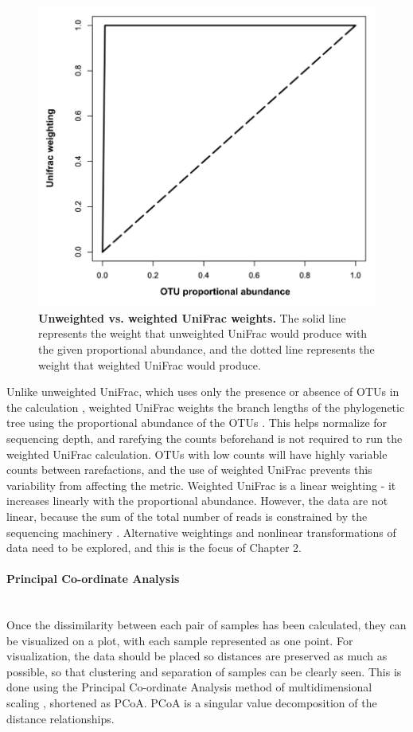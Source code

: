 \begin{figure}[h]
\includegraphics[scale=0.5]{weights.png}
\caption[Unweighted vs. weighted UniFrac weights.]{{\bf Unweighted vs. weighted UniFrac weights.}
The solid line represents the weight that unweighted UniFrac would produce with the given proportional abundance, and the dotted line represents the weight that weighted UniFrac would produce.}
\label{figure_weights}
\end{figure}

Unlike unweighted UniFrac, which uses only the presence or absence of OTUs in the calculation \cite{lozupone2005unifrac}, weighted UniFrac weights the branch lengths of the phylogenetic tree using the proportional abundance of the OTUs \cite{lozupone2007quantitative}. This helps normalize for sequencing depth, and rarefying the counts beforehand is not required to run the weighted UniFrac calculation. OTUs with low counts will have highly variable counts between rarefactions, and the use of weighted UniFrac prevents this variability from affecting the metric. Weighted UniFrac is a linear weighting - it increases linearly with the proportional abundance. However, the data are not linear, because the sum of the total number of reads is constrained by the sequencing machinery \cite{friedman2012inferring}. Alternative weightings and nonlinear transformations of data need to be explored, and this is the focus of Chapter 2.

\paragraph{Principal Co-ordinate Analysis}\mbox{}\\
Once the dissimilarity between each pair of samples has been calculated, they can be visualized on a plot, with each sample represented as one point. For visualization, the data should be placed so distances are preserved as much as possible, so that clustering and separation of samples can be clearly seen. This is done using the Principal Co-ordinate Analysis method of multidimensional scaling \cite{dollhopf2001interpreting}, shortened as PCoA. PCoA is a singular value decomposition of the distance relationships.

